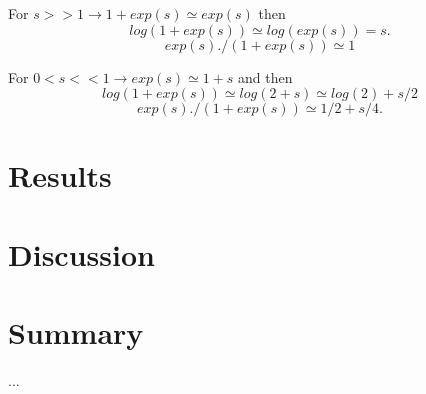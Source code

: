 \documentclass[10pt,conference,compsocconf]{IEEEtran}
\begin{document}
For $s >> 1 \rightarrow 1+exp(s) \simeq exp(s)$ then 
$$
log(1+exp(s)) \simeq log(exp(s))=s.
$$
$$
exp(s)./(1+exp(s))\simeq 1
$$

For $0 < s << 1 \rightarrow exp(s)\simeq 1+s$ and then
$$
log(1+exp(s))\simeq log(2+s) \simeq log(2)+s/2
$$
$$
exp(s)./(1+exp(s)) \simeq 1/2+s/4.
$$


\section{Results}



\section{Discussion}


\section{Summary}

...




\end{document}
